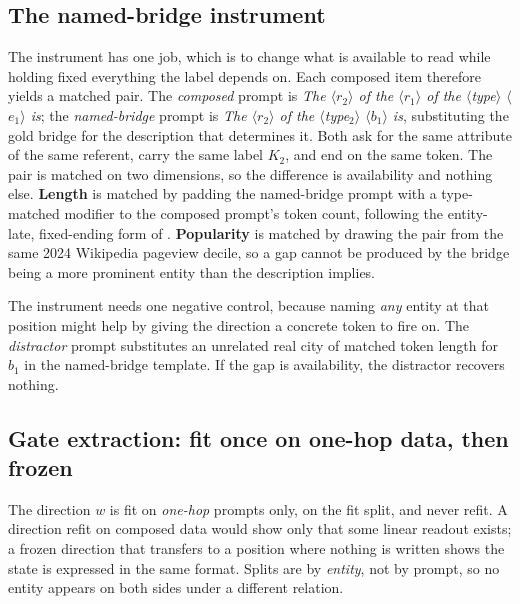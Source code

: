 \documentclass{article}
\newcommand{\prompt}[1]{\textit{#1}}
\newcommand{\slot}[1]{\ensuremath{\langle}#1\ensuremath{\rangle}}
\begin{document}
\subsection{The named-bridge instrument}
\label{sec:instrument}

The instrument has one job, which is to change what is available to read while holding fixed
everything the label depends on. Each composed item therefore yields a matched pair. The \emph{composed} prompt is
\prompt{The \slot{$r_2$} of the \slot{$r_1$} of the \slot{type} \slot{$e_1$} is}; the \emph{named-bridge} prompt is
\prompt{The \slot{$r_2$} of the \slot{type$_2$} \slot{$b_1$} is}, substituting the gold bridge for the description
that determines it. Both ask for the same attribute of the same referent, carry the same label $K_2$,
and end on the same token. The pair is matched on two dimensions, so the difference is availability and nothing else. \textbf{Length} is matched by padding the named-bridge prompt with a type-matched
modifier to the composed prompt's token count, following the entity-late, fixed-ending form of
\citet{tamoyan2025factual}. \textbf{Popularity} is matched by drawing the pair from the same 2024
Wikipedia pageview decile, so a gap cannot be produced by the bridge being a more prominent entity
than the description implies.

The instrument needs one negative control, because naming \emph{any} entity at that position might
help by giving the direction a concrete token to fire on. The \emph{distractor} prompt substitutes an
unrelated real city of matched token length for $b_1$ in the named-bridge template. If the gap is
availability, the distractor recovers nothing.

\subsection{Gate extraction: fit once on one-hop data, then frozen}
\label{sec:gate}

The direction $w$ is fit on \emph{one-hop} prompts only, on the fit split, and never refit. A
direction refit on composed data would show only that some linear readout exists; a frozen direction
that transfers to a position where nothing is written shows the state is expressed in the same format.
Splits are by \emph{entity}, not by prompt, so no entity appears on both sides under a different
relation.
\end{document}
